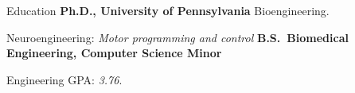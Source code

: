 \begin{rubric}{Education}
\entry*[2023 -- 2028 expected]%
	\textbf{Ph.D., University of Pennsylvania} Bioengineering.
	\par Neuroengineering: \emph{Motor programming and control}
%
\entry*[2018 -- 2022]%
	\textbf{B.S.~Biomedical Engineering, Computer Science Minor}\par
	Engineering GPA: \emph{3.76}.
% 
\end{rubric}